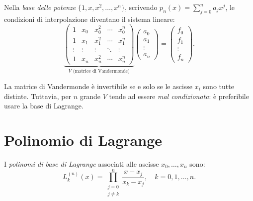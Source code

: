 Nella \emph{base delle potenze} $\{1, x, x^2, \ldots, x^n\}$, scrivendo
$p_n(x) = \sum_{j=0}^n a_j x^j$, le condizioni di interpolazione diventano il
sistema lineare:
\begin{equation}
  \underbrace{
  \begin{pmatrix}
    1      & x_0    & x_0^2  & \cdots & x_0^n \\
    1      & x_1    & x_1^2  & \cdots & x_1^n \\
    \vdots & \vdots & \vdots & \ddots & \vdots \\
    1      & x_n    & x_n^2  & \cdots & x_n^n
  \end{pmatrix}
  }_{V \text{ (matrice di Vandermonde)}}
  \begin{pmatrix} a_0 \\ a_1 \\ \vdots \\ a_n \end{pmatrix}
  =
  \begin{pmatrix} f_0 \\ f_1 \\ \vdots \\ f_n \end{pmatrix}.
  \label{eq:vandermonde}
\end{equation}

\begin{remark}
La matrice di Vandermonde è invertibile se e solo se le ascisse $x_i$ sono tutte
distinte. Tuttavia, per $n$ grande $V$ tende ad essere \emph{mal condizionata}: è
preferibile usare la base di Lagrange.
\end{remark}

\section{Polinomio di Lagrange}
\label{sec:lagrange}

\begin{definition}
I \emph{polinomi di base di Lagrange} associati alle ascisse $x_0,\ldots,x_n$ sono:
\begin{equation}
  L_k^{(n)}(x) = \prod_{\substack{j=0 \\ j \neq k}}^n \frac{x - x_j}{x_k - x_j},
  \quad k = 0, 1, \ldots, n.
  \label{eq:lagrange_base}
\end{equation}
\end{definition}

